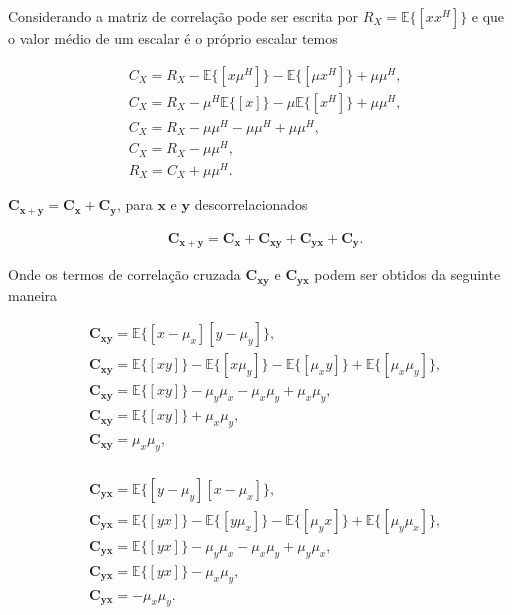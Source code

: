 Considerando a matriz de correlação pode ser escrita por $R_{X} = \mathbb{E}\{[xx^{H}]\}$ e que o valor médio de um escalar é o próprio escalar temos

\begin{align}
    &C_{X} = R_{X} - \mathbb{E}\{[x\mu^{H}]\} - \mathbb{E}\{[\mu x^{H}]\} + \mu \mu^{H}, \\
    &C_{X} = R_{X} - \mu^{H}\mathbb{E}\{[x]\} - \mu \mathbb{E}\{[x^{H}]\} + \mu \mu^{H}, \\
    &C_{X} = R_{X} - \mu \mu^{H} - \mu \mu^{H} + \mu \mu^{H}, \\
    &C_{X} = R_{X} - \mu \mu^{H}, \\
    &R_{X} = C_{X} + \mu \mu^{H}.
\end{align}

 $\mathbf{C}_{\mathbf{x} + \mathbf{y}} = \mathbf{C}_{\mathbf{x}} +
\mathbf{C}_{\mathbf{y}}$, para $\mathbf{x}$ e $\mathbf{y}$ descorrelacionados



\begin{align}
    &\mathbf{C}_{\mathbf{x} + \mathbf{y}} = \mathbf{C}_{\mathbf{x}} + \mathbf{C}_{\mathbf{xy}} + \mathbf{C}_{\mathbf{yx}} + \mathbf{C}_{\mathbf{y}}.
\end{align}

Onde os termos de correlação cruzada $\mathbf{C}_{\mathbf{xy}}$ e $\mathbf{C}_{\mathbf{yx}}$ podem ser obtidos  da seguinte maneira

\begin{align}
    &\mathbf{C_{xy}} = \mathbb{E}\{[x - \mu_{x}][y - \mu_{y}]\}, \\
    &\mathbf{C_{xy}} = \mathbb{E}\{[xy]\} - \mathbb{E}\{[x\mu_{y}]\} - \mathbb{E}\{[\mu_{x} y]\} + \mathbb{E}\{[\mu_{x} \mu_{y}]\}, \\
    &\mathbf{C_{xy}} = \mathbb{E}\{[xy]\} - \mu_{y} \mu_{x} - \mu_{x} \mu_{y} + \mu_{x} \mu_{y}, \\
    &\mathbf{C_{xy}} = \mathbb{E}\{[xy]\} + \mu_{x} \mu_{y}, \\
    &\mathbf{C_{xy}} = \mu_{x} \mu_{y}, \\
\end{align}

\begin{align}
    &\mathbf{C_{yx}} = \mathbb{E}\{[y - \mu_{y}][x - \mu_{x}]\}, \\
    &\mathbf{C_{yx}} = \mathbb{E}\{[yx]\} - \mathbb{E}\{[y\mu_{x}]\} - \mathbb{E}\{[\mu_{y} x]\} + \mathbb{E}\{[\mu_{y} \mu_{x}]\}, \\
    &\mathbf{C_{yx}} = \mathbb{E}\{[yx]\} - \mu_{y} \mu_{x} - \mu_{x} \mu_{y} + \mu_{y} \mu_{x}, \\
    &\mathbf{C_{yx}} = \mathbb{E}\{[yx]\} - \mu_{x} \mu_{y}, \\
    &\mathbf{C_{yx}} = - \mu_{x} \mu_{y}.
\end{align}

